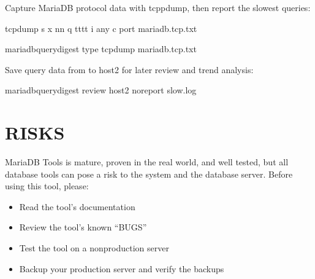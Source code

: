 \documentclass[letterpaper,10pt,english]{sphinxmanual}
\begin{document}
\sphinxAtStartPar
Capture MariaDB protocol data with tcppdump, then report the slowest queries:

\begin{sphinxVerbatim}[commandchars=\\\{\}]
tcpdump \PYGZhy{}s  \PYGZhy{}x \PYGZhy{}nn \PYGZhy{}q \PYGZhy{}tttt \PYGZhy{}i any \PYGZhy{}c  port  \PYGZgt{} mariadb.tcp.txt

mariadb\PYGZhy{}query\PYGZhy{}digest \PYGZhy{}\PYGZhy{}type tcpdump mariadb.tcp.txt
\end{sphinxVerbatim}

\sphinxAtStartPar
Save query data from  to host2 for later review and trend analysis:

\begin{sphinxVerbatim}[commandchars=\\\{\}]
mariadb\PYGZhy{}query\PYGZhy{}digest \PYGZhy{}\PYGZhy{}review host2 \PYGZhy{}\PYGZhy{}no\PYGZhy{}report slow.log
\end{sphinxVerbatim}


\section{RISKS}
\label{\detokenize{mariadb-query-digest:risks}}
\sphinxAtStartPar
MariaDB Tools is mature, proven in the real world, and well tested,
but all database tools can pose a risk to the system and the database
server.  Before using this tool, please:
\begin{itemize}
\item {} 
\sphinxAtStartPar
Read the tool’s documentation

\item {} 
\sphinxAtStartPar
Review the tool’s known “BUGS”

\item {} 
\sphinxAtStartPar
Test the tool on a non\sphinxhyphen{}production server

\item {} 
\sphinxAtStartPar
Backup your production server and verify the backups

\end{itemize}
\end{document}
